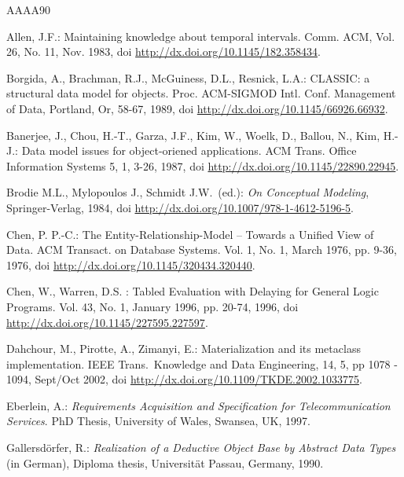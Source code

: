 
\renewcommand{\bibname}{References}

\begin{thebibliography}{AAAA90}



 Allen, J.F.:
Maintaining knowledge about temporal intervals.
Comm. ACM, Vol. 26, No. 11, Nov. 1983,
doi \url{http://dx.doi.org/10.1145/182.358434}.

 Borgida, A., Brachman, R.J., McGuiness, D.L., Resnick, L.A.:
CLASSIC: a structural data model for objects. Proc. ACM-SIGMOD
Intl. Conf. Management of Data, Portland, Or, 58-67, 1989,
doi \url{http://dx.doi.org/10.1145/66926.66932}.

 Banerjee, J., Chou, H.-T., Garza, J.F., Kim, W., Woelk, D.,
Ballou, N., Kim, H.-J.: Data model issues for object-oriened
applications. ACM Trans. Office Information Systems 5, 1, 3-26, 1987,
doi \url{http://dx.doi.org/10.1145/22890.22945}.

Brodie M.L., Mylopoulos J., Schmidt J.W.\ (ed.):
{\em On Conceptual Modeling},
Springer-Verlag, 1984,
doi \url{http://dx.doi.org/10.1007/978-1-4612-5196-5}.

 Chen, P. P.-C.: The Entity-Relationship-Model --
Towards a Unified View of Data. ACM Transact. on Database Systems.
Vol. 1, No. 1, March 1976, pp. 9-36, 1976,
doi \url{http://dx.doi.org/10.1145/320434.320440}.

 Chen, W., Warren, D.S. : 
Tabled Evaluation with Delaying for General Logic Programs. 
Vol. 43, No. 1, January 1996, pp. 20-74, 1996,
doi \url{http://dx.doi.org/10.1145/227595.227597}.

  Dahchour, M., Pirotte, A., Zimanyi, E.:
Materialization and its metaclass implementation.
{IEEE Trans.\ Knowledge and Data Engineering},
14, 5, pp 1078 - 1094, Sept/Oct 2002, doi \url{http://dx.doi.org/10.1109/TKDE.2002.1033775}.

 Eberlein, A.:
{\em  Requirements Acquisition and Specification for Telecommunication Services}.
PhD Thesis, University of Wales, Swansea, UK, 1997.


Gallersd\"orfer, R.:
{\em Realization of a Deductive Object Base by Abstract Data Types} (in German),
Diploma thesis, Universit\"at Passau, Germany, 1990.


\end{thebibliography}
